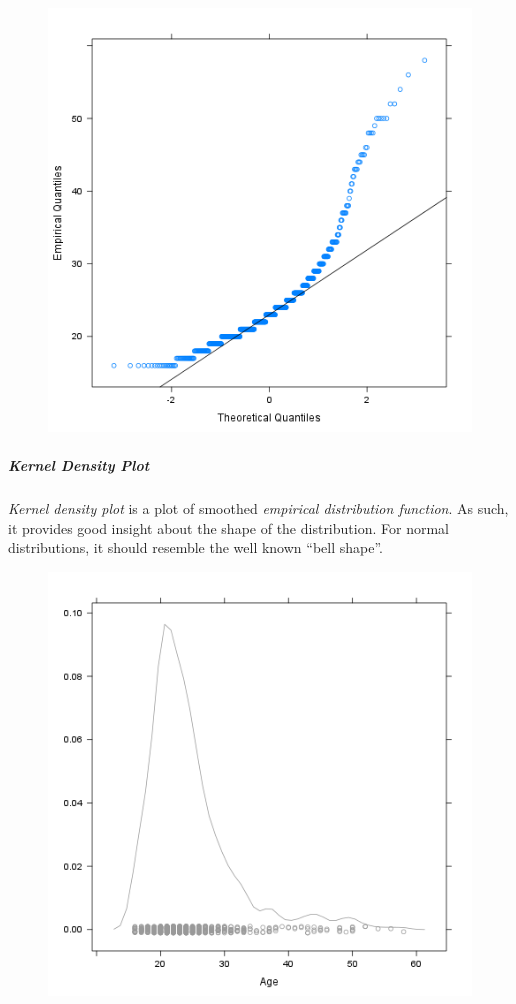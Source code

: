 \documentclass[]{article}
\makeatletter
\def\maxwidth{\ifdim\Gin@nat@width>\linewidth\linewidth
\else\Gin@nat@width\fi}
\let\Oldincludegraphics\includegraphics
\renewcommand{\includegraphics}[1]{\Oldincludegraphics[width=\maxwidth]{#1}}
\makeatother
\begin{document}
\begin{figure}[htbp]
\centering
\includegraphics{cbbba756d844aa053998959b73b9feff.png}
\caption{}
\end{figure}

\subparagraph{Kernel Density Plot}

\emph{Kernel density plot} is a plot of smoothed \emph{empirical
distribution function}. As such, it provides good insight about the
shape of the distribution. For normal distributions, it should resemble
the well known ``bell shape''.

\begin{figure}[htbp]
\centering
\includegraphics{4192d6bda3c1f1c8f268b9344e9786ee.png}
\caption{}
\end{figure}
\end{document}
